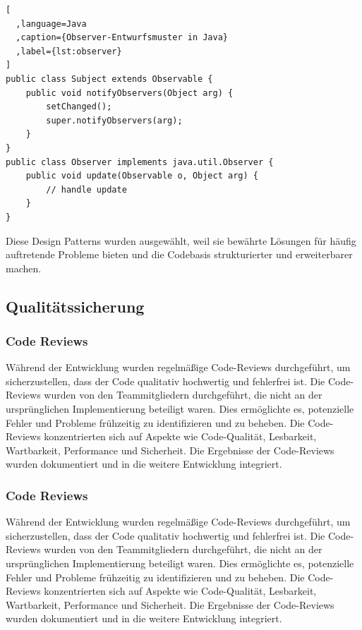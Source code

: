 \begin{lstlisting}[
  ,language=Java
  ,caption={Observer-Entwurfsmuster in Java}
  ,label={lst:observer}
]
public class Subject extends Observable {
    public void notifyObservers(Object arg) {
        setChanged();
        super.notifyObservers(arg);
    }
}
public class Observer implements java.util.Observer {
    public void update(Observable o, Object arg) {
        // handle update
    }
}
\end{lstlisting}

Diese Design Patterns wurden ausgewählt, weil sie bewährte Lösungen für häufig auftretende Probleme bieten und die Codebasis strukturierter und erweiterbarer machen.

\subsection{Qualitätssicherung}\label{qualituxe4tssicherung}

\subsubsection{Code Reviews}\label{code-reviews}

Während der Entwicklung wurden regelmäßige Code-Reviews durchgeführt, um sicherzustellen, dass der Code qualitativ hochwertig und fehlerfrei ist. Die Code-Reviews wurden von den Teammitgliedern durchgeführt, die nicht an der ursprünglichen Implementierung beteiligt waren. Dies ermöglichte es, potenzielle Fehler und Probleme frühzeitig zu identifizieren und zu beheben. Die Code-Reviews konzentrierten sich auf Aspekte wie Code-Qualität, Lesbarkeit, Wartbarkeit, Performance und Sicherheit. Die Ergebnisse der Code-Reviews wurden dokumentiert und in die weitere Entwicklung integriert.

\subsubsection{Code Reviews}\label{code-reviews}

Während der Entwicklung wurden regelmäßige Code-Reviews durchgeführt, um sicherzustellen, dass der Code qualitativ hochwertig und fehlerfrei ist. Die Code-Reviews wurden von den Teammitgliedern durchgeführt, die nicht an der ursprünglichen Implementierung beteiligt waren. Dies ermöglichte es, potenzielle Fehler und Probleme frühzeitig zu identifizieren und zu beheben. Die Code-Reviews konzentrierten sich auf Aspekte wie Code-Qualität, Lesbarkeit, Wartbarkeit, Performance und Sicherheit. Die Ergebnisse der Code-Reviews wurden dokumentiert und in die weitere Entwicklung integriert.

